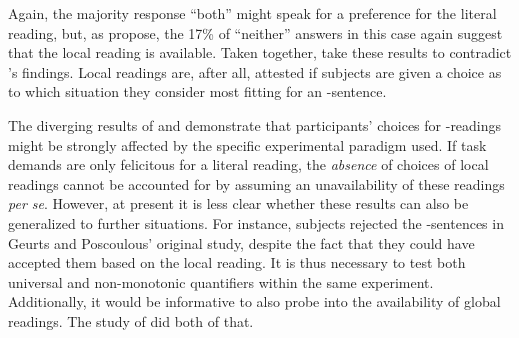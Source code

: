 \documentclass[fleqn,reqno,10pt,draft]{article}
\newcommand{\as}{\acro{as}}
\renewcommand{\es}{\acro{es}}
\begin{document}
\noindent Again, the majority response ``both'' might speak for a
preference for the literal reading, but, as
\citeauthor{CliftonDube2010:Embedded-Implic} propose, the 17\% of
``neither'' answers in this case again suggest that the local reading
is available. Taken together,
\citeauthor{CliftonDube2010:Embedded-Implic} take these results to
contradict \citeauthor{GeurtsPouscoulous2009:Embedded-Implic}'s
findings. Local readings are, after all, attested if subjects are
given a choice as to which situation they consider most fitting for an
\as-sentence.

The diverging results of
\citeauthor{GeurtsPouscoulous2009:Embedded-Implic} and
\citeauthor{CliftonDube2010:Embedded-Implic} demonstrate that
participants' choices for \as-readings might be strongly affected by
the specific experimental paradigm used. If task demands are only
felicitous for a literal reading, the \emph{absence} of choices of
local readings cannot be accounted for by assuming an unavailability
of these readings \emph{per se}. However, at present it is less clear whether these results
can also be generalized to further situations. For instance, subjects
rejected the \es-sentences in Geurts and Poscoulous' original study,
despite the fact that they could have accepted them based on the local
reading. It is thus necessary to test both universal and non-monotonic
quantifiers within the same experiment. Additionally, it would be
informative to also probe into the availability of global
readings. The study of \citet{ChemlaSpector2010:Experimental-Ev} did
both of that.

\subsection{\citet{ChemlaSpector2010:Experimental-Ev}}
\label{sec:Chemla-Spector}
\end{document}
